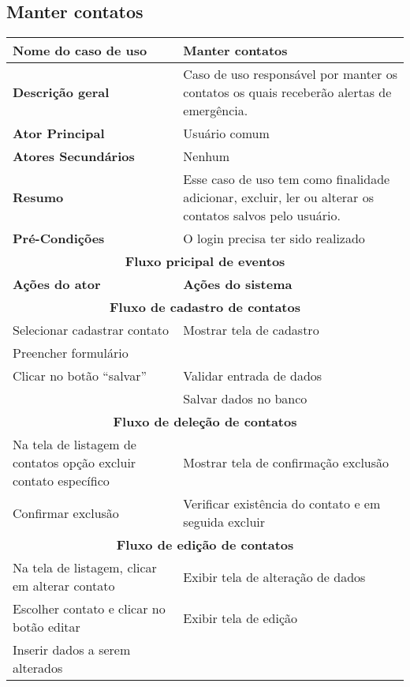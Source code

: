 \subsection{Manter contatos}
\begin{center}
\begin{tabular}{ |p{7cm}|p{7cm}| } 
 \hline
 \textbf {Nome do caso de uso} & Manter contatos \\
 \hline
 \textbf{Descrição geral} & Caso de uso responsável por manter os contatos os quais receberão alertas de emergência. \\
 \hline
 \textbf{Ator Principal} & Usuário comum \\ 
 \hline
 \textbf{Atores Secundários} & Nenhum \\
 \hline
 \textbf{Resumo} & Esse caso de uso tem como finalidade adicionar, excluir, ler ou alterar os contatos salvos pelo usuário. \\
 \hline
 \textbf{Pré-Condições} & O login precisa ter sido realizado \\
 \hline 
 \multicolumn{2}{|c|}{\textbf{Fluxo pricipal de eventos} } \\
 \hline
 \textbf{Ações do ator} & \textbf{Ações do sistema} \\
 \hline
 \multicolumn{2}{|c|}{\textbf{Fluxo de cadastro de contatos} } \\
 \hline 
 Selecionar cadastrar contato & Mostrar tela de cadastro \\
 \hline
 Preencher formulário & \\
 \hline
 Clicar no botão “salvar” & Validar entrada de dados \\
 \hline
  & Salvar dados no banco \\
 \hline
 \multicolumn{2}{|c|}{\textbf{Fluxo de deleção de contatos} } \\
 \hline 
 Na tela de listagem de contatos opção excluir contato específico & Mostrar tela de confirmação exclusão \\
 \hline
 Confirmar exclusão & Verificar existência do contato e em seguida excluir \\
 \hline
 \multicolumn{2}{|c|}{\textbf{Fluxo de edição de contatos} } \\
 \hline 
 Na tela de listagem, clicar em alterar contato & Exibir tela de alteração de dados \\
 \hline
 Escolher contato e clicar no botão editar & Exibir tela de edição \\
 \hline
 Inserir dados a serem alterados & \\

\end{tabular}
\end{center}
